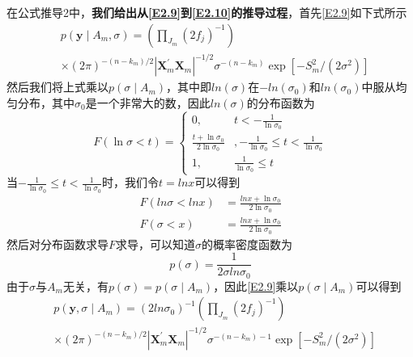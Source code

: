 \documentclass[12pt]{article} %
\begin{document}
	在公式推导2中，\textbf{我们给出从\eqref{E2.9}到\eqref{E2.10}的推导过程}，首先\eqref{E2.9}如下式所示
	\begin{equation*}
		\begin{aligned}
			&p\left(\mathbf{y} \mid A_{m}, \sigma\right)=\left(\prod_{J_{m}}\left(2 f_{j}\right)^{-1}\right) \\
			&\times(2 \pi)^{-\left(n-k_{m}\right) / 2}\left|\mathbf{X}_{m}^{\prime} \mathbf{X}_{m}\right|^{-1 / 2} \sigma^{-\left(n-k_{m}\right)} \exp \left[-S_{m}^{2} /\left(2 \sigma^{2}\right)\right] 
		\end{aligned}
	\end{equation*}
	然后我们将上式乘以$p(\sigma \mid A_m)$，其中即$ln(\sigma)$在$-ln(\sigma_0)$和$ln(\sigma_0)$中服从均匀分布，其中$\sigma_0$是一个非常大的数，因此$ln(\sigma)$的分布函数为
	\begin{equation*}
		F(\ln \sigma<t)=\left\{\begin{array}{cc}
			0, & t<-\frac{1}{\ln \sigma_{0}} \\
			\frac{t+\ln \sigma_{0}}{2 \ln \sigma_{0}} & ,-\frac{1}{\ln \sigma_{0}} \leqslant t<\frac{1}{\ln \sigma_{0}} \\
			1, & \frac{1}{\ln \sigma_{0}} \leqslant t
		\end{array}\right.
	\end{equation*}
	当$-\frac{1}{\ln \sigma_{0}} \leqslant t<\frac{1}{\ln \sigma_{0}}$时，我们令$t=lnx$可以得到
	\begin{equation*}
		\begin{aligned}
			F(ln\sigma < lnx) &= \frac{lnx+\ln \sigma_{0}}{2 \ln \sigma_{0}} \\
			F(\sigma < x) &= \frac{lnx+\ln \sigma_{0}}{2 \ln \sigma_{0}}
		\end{aligned}
	\end{equation*}
	然后对分布函数求导$F$求导，可以知道$\sigma$的概率密度函数为
	\begin{equation*}
		p(\sigma) = \dfrac{1}{2 \sigma ln \sigma_{0} }
	\end{equation*}
	由于$\sigma$与$A_m$无关，有$p(\sigma) = p(\sigma \mid A_m)$，因此\eqref{E2.9}乘以$p(\sigma \mid A_m)$可以得到
	\begin{equation*}
		\begin{aligned}
			&p\left(\mathbf{y}, \sigma \mid A_{m}\right)= (2 ln\sigma_{0})^{-1} \left(\prod_{J_{m}}\left(2 f_{j}\right)^{-1}\right) \\
			&\times(2 \pi)^{-\left(n-k_{m}\right) / 2}\left|\mathbf{X}_{m}^{\prime} \mathbf{X}_{m}\right|^{-1 / 2} \sigma^{-\left(n-k_{m}  \right) -1} \exp \left[-S_{m}^{2} /\left(2 \sigma^{2}\right)\right] 
		\end{aligned}
	\end{equation*}
\end{document}
